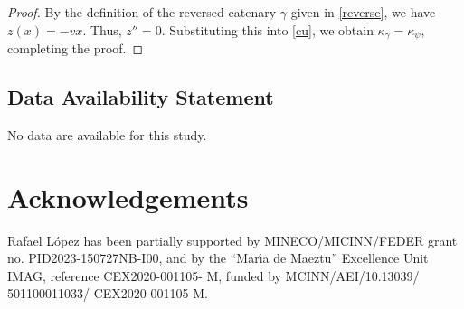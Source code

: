 \documentclass[a4paper,12pt]{amsart}
\theoremstyle{definition}
\begin{document}
\begin{proof}
By the definition of the reversed catenary $\gamma$ given in \eqref{reverse}, we have $z(x) = -vx$. Thus, $z''=0$. Substituting this into \eqref{cu}, we obtain $\kappa_\gamma=\kappa_\psi$, completing the proof.
\end{proof}


\subsection*{Data Availability Statement}
No data are available for this study.

  \section*{Acknowledgements}
Rafael L\'opez  has been partially supported by MINECO/MICINN/FEDER grant no. PID2023-150727NB-I00,  and by the ``Mar\'{\i}a de Maeztu'' Excellence Unit IMAG, reference CEX2020-001105- M, funded by MCINN/AEI/10.13039/ 501100011033/ CEX2020-001105-M.
\end{document}
